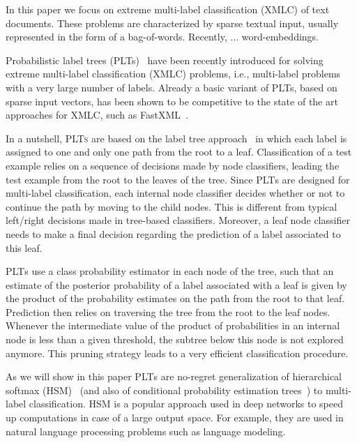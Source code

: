 \documentclass{article}
\newcommand{\Algo}[1]{\textsc{#1}}
\begin{document}
In this paper we focus on extreme multi-label classification (XMLC) of text documents. These problems are characterized by sparse textual input, usually represented in the form of a bag-of-words. 
Recently, ... word-embeddings. 


Probabilistic label trees (PLTs)~\citep{Jasinska_et_al_2016} have been recently introduced for solving extreme multi-label classification (XMLC) problems, i.e., multi-label problems with a very large number of labels. Already a basic variant of PLTs, based on sparse input vectors, has been shown to be competitive to the state of the art approaches for XMLC, such as FastXML~\citep{Prabhu_Varma_2014}. 

In a nutshell, \Algo{PLTs} are based on the label tree approach~\cite{Beygelzimer_et_al_2009a,Bengio_et_al_2010,Deng_et_al_2011} in which each label is assigned to one and only one path from the root to a leaf. Classification of a test example relies on a sequence of decisions made by node classifiers, leading the test example from the root to the leaves of the tree. Since \Algo{PLT}s are designed for multi-label classification, each internal node classifier decides whether or not to continue the path by moving to the child nodes. This is different from typical left/right decisions made in tree-based classifiers.  Moreover, a leaf node classifier needs to make a final decision regarding the prediction of a label associated to this leaf. 

\Algo{PLT}s use a class probability estimator in each node of the tree, such that an estimate of the posterior probability of a label associated with a leaf is given by the product of the probability estimates on the path from the root to that leaf. Prediction then relies on traversing the tree from the root to the leaf nodes. Whenever the intermediate value of the product of probabilities in an internal node is less than a given threshold, the subtree below this node is not explored anymore. This pruning strategy leads to a very efficient classification procedure.

As we will show in this paper \Algo{PLT}s are no-regret generalization of hierarchical softmax (HSM)~\cite{Morin_Bengio_2005} (and also of conditional probability estimation trees~\cite{Beygelzimer_et_al_2009b}) to multi-label classification. HSM is a popular approach used in deep networks to speed up computations in case of a large output space. For example, they are used in natural language processing problems such as language modeling.  
\end{document}
